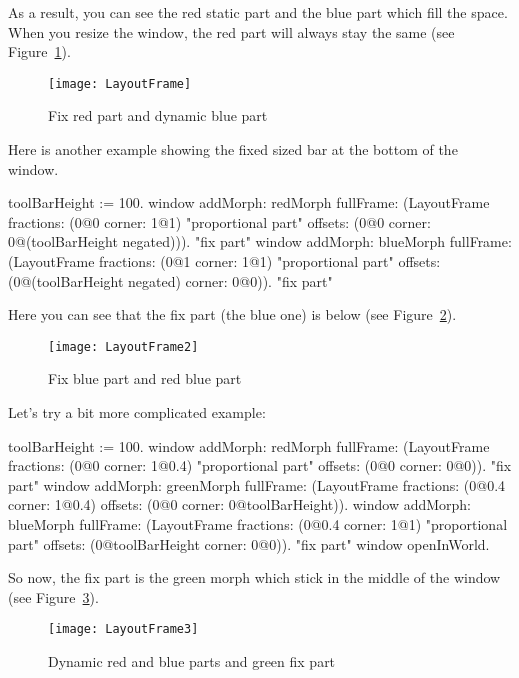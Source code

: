\documentclass[a4paper,10pt,twoside]{book}
\begin{document}


As a result, you can see the red static part and the blue part which fill the space. When you resize the window, the red part will always stay the same (see Figure~\ref{fig:layoutFrame}).

\begin{figure}[ht]\centering
	\texttt{[image: LayoutFrame]}
	\caption{Fix red part and dynamic blue part}
	\label{fig:layoutFrame}
\end{figure}

Here is another example showing the fixed sized bar at the bottom of the window.
\begin{code}{}
toolBarHeight := 100.
window
	addMorph: redMorph
	fullFrame: (LayoutFrame
				fractions: (0@0 corner: 1@1) "proportional part"
				offsets: (0@0 corner: 0@(toolBarHeight negated))). "fix part"
window
	addMorph: blueMorph
	fullFrame: (LayoutFrame
				fractions: (0@1 corner: 1@1) "proportional part"
				offsets: (0@(toolBarHeight negated) corner: 0@0)). "fix part"
\end{code}

Here you can see that the fix part (the blue one) is below (see Figure~\ref{fig:layoutFrame2}).

\begin{figure}[ht]\centering
	\texttt{[image: LayoutFrame2]}
	\caption{Fix blue part and red blue part}
	\label{fig:layoutFrame2}
\end{figure}

Let's try a bit more complicated example:
\begin{code}{}
toolBarHeight := 100.
window
	addMorph: redMorph
	fullFrame: (LayoutFrame
				fractions: (0@0 corner: 1@0.4) "proportional part"
				offsets: (0@0 corner: 0@0)). "fix part"
window
	addMorph: greenMorph
	fullFrame: (LayoutFrame
				fractions: (0@0.4 corner: 1@0.4)
				offsets: (0@0 corner: 0@toolBarHeight)).				
window
	addMorph: blueMorph
	fullFrame: (LayoutFrame
				fractions: (0@0.4 corner: 1@1) "proportional part"
				offsets: (0@toolBarHeight corner: 0@0)). "fix part"
window openInWorld.
\end{code}

So now, the fix part is the green morph which stick in the middle of the window (see Figure~\ref{fig:layoutFrame3}).

\begin{figure}[ht]\centering
	\texttt{[image: LayoutFrame3]}
	\caption{Dynamic red and blue parts and green fix part}
	\label{fig:layoutFrame3}
\end{figure}
\end{document}
